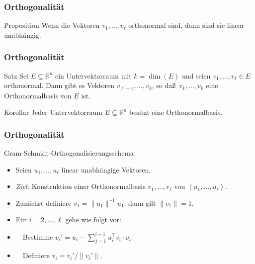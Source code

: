 \documentclass{beamer}
\renewcommand{\emph}[1]{{\textcolor{solarizedRed}{\itshape #1}}}
\newcommand\RR{\mathbb R}
\newcommand{\bck}[1]{\left\langle{#1}\right\rangle}
\newcommand{\trans}{\top}
\renewcommand{\ae}{\"a}
\newcommand{\ue}{\"u}
\newcommand{\mytitle}{Orthogonalit\ae t}
\begin{document}
\begin{frame}\frametitle{\mytitle}
	\begin{block}{Proposition}
		Wenn die Vektoren $v_1,\ldots,v_\ell$ orthonormal sind, dann sind sie linear unabh\ae ngig.
	\end{block}
\end{frame}

\begin{frame}\frametitle{\mytitle}
	\begin{block}{Satz}
		Sei $E\subseteq\RR^n$ ein Untervektorraum mit $k=\dim(E)$ und seien $v_1,\ldots,v_\ell\in E$ orthonormal.
		Dann gibt es Vektoren $v_{\ell+1},\ldots,v_k$, so da\ss\ $v_1,\ldots,v_k$ eine Orthonormalbasis von $E$ ist.
	\end{block}
	\begin{block}{Korollar}
		Jeder Untervektorraum $E\subseteq\RR^n$ besitzt eine Orthonormalbasis.
	\end{block}
\end{frame}

\begin{frame}\frametitle{\mytitle}
	\begin{block}{Gram-Schmidt-Orthogonalisierungsschema}
	\begin{itemize}
	\item Seien $u_1,\ldots,u_\ell$ linear unabh\ae ngige Vektoren.
	\item \emph{Ziel:} Konstruktion einer Orthonormalbasis $v_1,\ldots,v_\ell$ von $\bck{u_1,\ldots,u_\ell}$. 
	\item Zun\ae chst definiere $v_1=\|u_1\|^{-1}u_1$; dann gilt $\|v_1\|=1$.
	\item F\ue r $i=2,\ldots,\ell$ gehe wie folgt vor:
	\item $\quad$Bestimme $v_i'=u_i-\sum_{j=1}^{i-1}u_i^\trans v_i\cdot v_i$.
	\item $\quad$Definiere $v_i=v_i'/\|v_i'\|$.
	\end{itemize}
	\end{block}
\end{frame}
\end{document}
